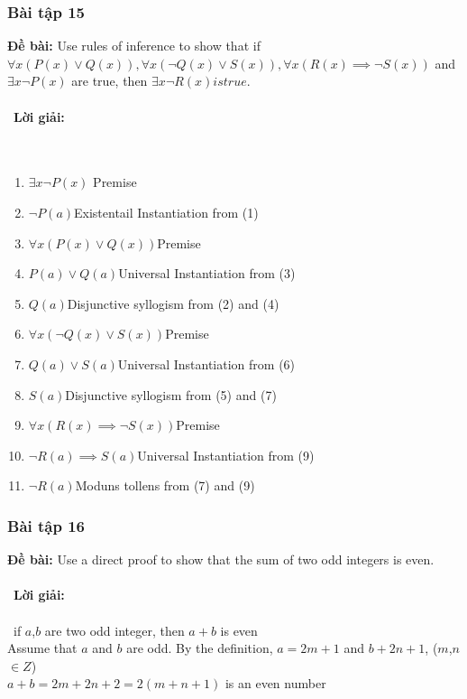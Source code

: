 \documentclass[a4paper]{article}
\begin{document}
\subsubsection{Bài tập 15}
\textbf{Đề bài:} Use rules of inference to show that if $\forall x (P(x) \lor Q(x)), \forall x (\lnot Q(x) \lor S(x)), \forall x (R(x) \implies \lnot S(x))$ and $ \exists x \lnot P(x)$ are true, then $\exists x \lnot R(x) is true$.
\\\ \\\
\textbf{Lời giải:} \\\ \\\
\begin{enumerate}
	\item $\exists x \lnot P(x)$ \hfill Premise\\
	\item $\lnot P(a)$\hfill Existentail Instantiation from (1)\\
	\item $ \forall x (P(x) \lor Q(x))$\hfill Premise\\
	\item $ P(a) \lor Q(a)$\hfill Universal Instantiation from (3)\\
	\item $ Q(a)$\hfill Disjunctive syllogism from (2) and (4)\\
	\item $\forall x (\lnot Q(x) \lor S(x))$\hfill Premise\\
	\item $ Q(a) \lor S(a)$\hfill Universal Instantiation from (6)\\
	\item $ S(a)$\hfill Disjunctive syllogism from (5) and (7)\\
	\item $ \forall x (R(x) \implies \lnot S(x))$\hfill Premise \\
	\item $ \lnot R(a) \implies S(a)$\hfill Universal Instantiation from (9)\\
	\item $ \lnot R(a)$\hfill Moduns tollens from (7) and (9)\\
\end{enumerate}
\clearpage
\subsubsection{Bài tập 16}
\textbf{Đề bài:} Use a direct proof to show that the sum of two odd integers is even. 
\\\ \\\
\textbf{Lời giải:} \\\ \\\
if $a$,$b$ are two odd integer, then $a+b$ is even\\
Assume that $a$ and $b$ are odd. By the definition, $a=2m+1$ and $b+2n+1$, ($m$,$n$ $\in Z$)\\
$a+b=2m+2n+2=2(m+n+1)$ is an even number\\
\clearpage
\end{document}
